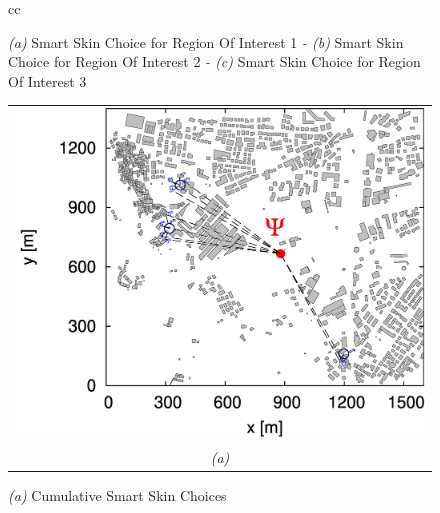 \begin{figure}[H]
\begin{center}
\begin{tabular}{cc}
\tabularnewline
{}\tabularnewline
\end{tabular}\end{center}
\caption{\footnotesize \emph{(a)} Smart Skin Choice for Region Of Interest 1 \emph{- (b)}
Smart Skin Choice for Region Of Interest 2 \emph{- (c)} Smart Skin
Choice for Region Of Interest 3}
\end{figure}


%
\begin{figure}[H]
\begin{center}\begin{tabular}{c}
\includegraphics[scale=0.1]{./Figure/Planning.EM/Fig.Scenario.BTS.Rays.jpg}\tabularnewline
\emph{(a)}\tabularnewline
\end{tabular}\end{center}


\caption{\footnotesize \emph{(a)} Cumulative Smart Skin Choices}
\end{figure}



